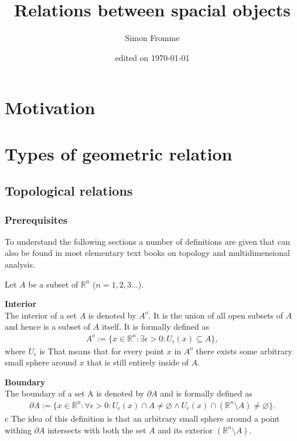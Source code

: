 \documentclass[paper=a4, fontsize=11pt]{scrartcl} %
\title{Relations between spacial objects}
\author{Simon Fromme}
\date{\normalsize edited on \today}
\numberwithin{equation}{section} %
\numberwithin{figure}{section} %
\numberwithin{table}{section} %
\begin{document}
\maketitle
\newpage
\tableofcontents
\newpage

\section{Motivation}


\section{Types of geometric relation}
\subsection{Topological relations}
\subsubsection{Prerequisites}

To understand the following sections a number of definitions are given that can also be found in most elementary text books on topology and multidimensional analysis.

Let $A$ be a subset of $\mathbb{R}^n$ ($n=1,2,3\dots$).

\textbf{Interior}\\
The interior of a set $A$ is denoted by $A^o$. It is the union of all open subsets of $A$ and hence is a subset of $A$ itself. It is formally defined as
\begin{align*}
  A^o := \{ x\in \mathbb{R}^n : \exists \epsilon > 0 : U_{\epsilon}(x) \subseteq A \},
\end{align*}
where $U_{\epsilon}$ is 
That means that for every point $x$ in $A^o$ there exists some arbitrary small sphere around $x$ that is still entirely inside of $A$. 

\textbf{Boundary} \\
The boundary of a set A is denoted by $\partial A$ and is formally defined as
\begin{align*}
  \partial A := \{ x \in \mathbb{R}^n : \forall \epsilon > 0 : U_{\epsilon}(x) \cap A \ne \varnothing \wedge U_{\epsilon}(x) \cap (\mathbb{R}^n \setminus A) \ne \varnothing    \}.
\end{align*}c
The idea of this definition is that an arbitrary small sphere around a point withing $\partial A$ intersects with both the set $A$ and its exterior $(\mathbb{R}^n \setminus A)$.
\end{document}
